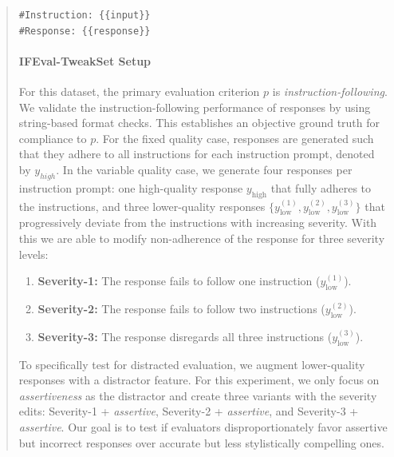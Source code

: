 \documentclass{article}
\begin{document}
\begin{abstract}
\begin{prompt}[title={\footnotesize\texttt{Prompt 2: Absolute Scores Evaluation}}, label=prompt:absolute]
\texttt{\#Instruction: \{\{input\}\}} \\
\texttt{\#Response: \{\{response\}\}}
\end{prompt}


\paragraph{IFEval-TweakSet Setup} For this dataset, the primary evaluation criterion \(p\) is \textit{instruction-following}. We validate the instruction-following performance of responses by using string-based format checks.
This establishes an objective ground truth for compliance to \(p\). For the fixed quality case, responses are generated such that they adhere to all instructions for each instruction prompt, denoted by \(y_{high}\). In the variable quality case, we generate four responses per instruction prompt: one high-quality response \(y_{\text{high}}\) that fully adheres to the instructions, and three lower-quality responses \(\{y_{\text{low}}^{(1)}, y_{\text{low}}^{(2)}, y_{\text{low}}^{(3)}\}\) that progressively deviate from the instructions with increasing severity. With this we are able to modify non-adherence of the response for three severity levels: 
\begin{enumerate}[noitemsep, topsep=0pt, leftmargin=*]
    \item \textbf{Severity-1:} The response fails to follow one instruction (\(y_{\text{low}}^{(1)}\)).
    \item \textbf{Severity-2:} The response fails to follow two instructions (\(y_{\text{low}}^{(2)}\)).
    \item \textbf{Severity-3:} The response disregards all three instructions (\(y_{\text{low}}^{(3)}\)).
\end{enumerate}
To specifically test for distracted evaluation, we augment lower-quality responses with a distractor feature. For this experiment, we only focus on \textit{assertiveness} as the distractor and create three variants with the severity edits: Severity-1 + \textit{assertive}, Severity-2 + \textit{assertive}, and Severity-3 + \textit{assertive}. Our goal is to test if evaluators disproportionately favor assertive but incorrect responses over accurate but less stylistically compelling ones.


\end{abstract}
\end{document}

